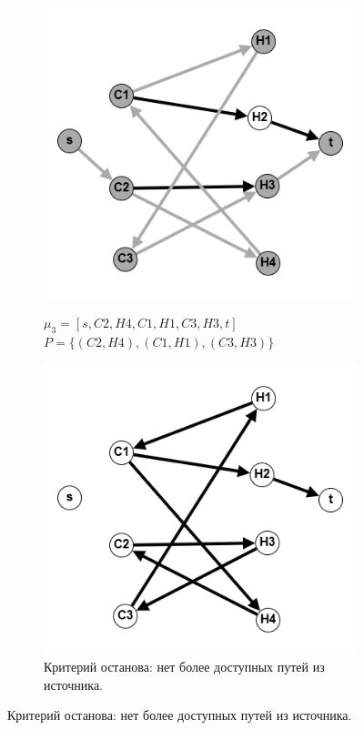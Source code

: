 \documentclass{article}
\begin{document}
\begin{enumerate}
\begin{figure}
\begin{subfigure}[b]{0.35\textwidth}
         \label{fig:12_2}
     \end{subfigure}
     \hfill
     \begin{subfigure}[b]{0.35\textwidth}
        \centering
         \caption*{$\mu_3 = [s, C2, H4, C1, H1, C3, H3, t]$\\$P =\{(C2, H4),(C1, H1), (C3, H3)\}$}
        \includegraphics[width=\textwidth]{attachments/12/3.png}
         \label{fig:12_3}
     \end{subfigure}
     \hfill
     \begin{subfigure}[b]{0.37\textwidth}
        \centering
         \caption*{Критерий останова: нет более доступных путей из источника.}
        \includegraphics[width=\textwidth]{attachments/12/4.png}

\end{subfigure}
\end{figure}
\end{enumerate}
\end{document}
